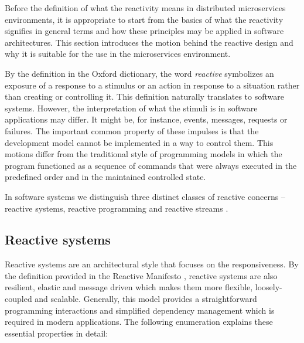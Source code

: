 \documentclass[oneside,
  digital, %
  table,   %
  lof,     %
  lot,     %
]{fithesis3}
\begin{document}
Before the definition of what the reactivity means in distributed microservices environments, it is appropriate to start from the basics of what the reactivity signifies in general terms and how these principles may be applied in software architectures. This section introduces the motion behind the reactive design and why it is suitable for the use in the microservices environment.

By the definition in the Oxford dictionary, the word \textit{reactive} symbolizes an exposure of a response to a stimulus or an action in response to a situation rather than creating or controlling it. This definition naturally translates to software systems. However, the interpretation of what the stimuli is in software applications may differ. It might be, for instance, events, messages, requests or failures. The important common property of these impulses is that the development model cannot be implemented in a way to control them. This motions differ from the traditional style of programming models in which the program functioned as a sequence of commands that were always executed in the predefined order and in the maintained controlled state.

In software systems we distinguish three distinct classes of reactive concerns -- reactive systems, reactive programming and reactive streams \cite{reactive_landscape}. 

\subsection{Reactive systems}

Reactive systems are an architectural style that focuses on the responsiveness. By the definition provided in the Reactive Manifesto \cite{reactive_manifesto}, reactive systems are also resilient, elastic and message driven which makes them more flexible, loosely-coupled and scalable. Generally, this model provides a straightforward programming interactions and simplified dependency management which is required in modern applications. The following enumeration explains these essential properties in detail:
\end{document}
